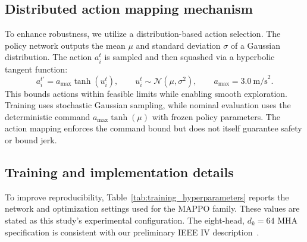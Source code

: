 \documentclass{ieeeaccess}
\begin{document}
\subsection{Distributed action mapping mechanism}
To enhance robustness, we utilize a distribution-based action selection. The policy network outputs the mean \(\mu\) and standard deviation \(\sigma\) of a Gaussian distribution. The action \(a_{i}^{t}\) is sampled and then squashed via a hyperbolic tangent function:
\begin{equation}
a_{i}^{t'} = a_{\max}\tanh(u_{i}^{t}), \qquad
u_{i}^{t} \sim \mathcal{N}(\mu, \sigma^2), \qquad
a_{\max}=3.0~\text{m/s}^2 .
\end{equation} %
This bounds actions within feasible limits while enabling smooth exploration. Training uses stochastic Gaussian sampling, while nominal evaluation uses the deterministic command $a_{\max}\tanh(\mu)$ with frozen policy parameters. The action mapping enforces the command bound but does not itself guarantee safety or bound jerk. %


\subsection{Training and implementation details}
\label{sec:training_details}

To improve reproducibility, Table~\ref{tab:training_hyperparameters} reports the network and optimization settings used for the MAPPO family. These values are stated as this study's experimental configuration. The eight-head, $d_k=64$ MHA specification is consistent with our preliminary IEEE IV description~\cite{cai2026integrating}.
\end{document}
